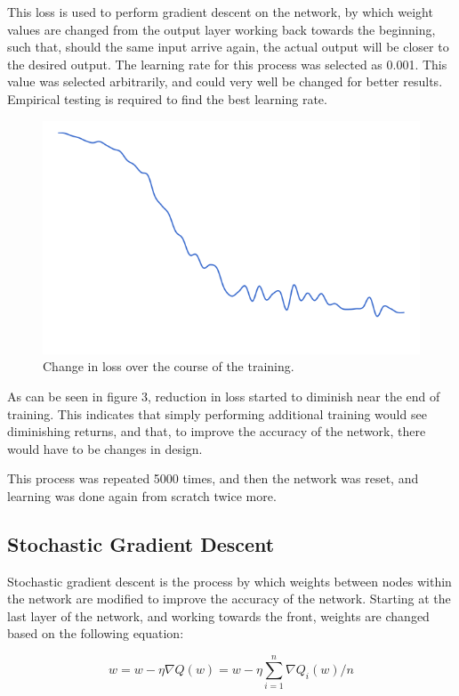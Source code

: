 \documentclass{article}
\begin{document}
This loss is used to perform gradient descent on the network, by which weight values are changed from the output layer working back towards the beginning, such that, should the same input arrive again, the actual output will be closer to the desired output. The learning rate for this process was selected as 0.001. This value was selected arbitrarily, and could very well be changed for better results. Empirical testing is required to find the best learning rate.

\begin{figure}
  \centering
  	\includegraphics[width=0.8\linewidth]{figures/chart}
  \caption{Change in loss over the course of the training.}
\end{figure}

As can be seen in figure 3, reduction in loss started to diminish near the end of training. This indicates that simply performing additional training would see diminishing returns, and that, to improve the accuracy of the network, there would have to be changes in design.

This process was repeated 5000 times, and then the network was reset, and learning was done again from scratch twice more.

\subsection{Stochastic Gradient Descent}

Stochastic gradient descent is the process by which weights between nodes within the network are modified to improve the accuracy of the network. Starting at the last layer of the network, and working towards the front, weights are changed based on the following equation:

\begin{equation*}
	w = w - \eta \nabla Q(w) = w - \eta \sum_{i=1}^{n} \nabla Q_i(w)/n
\end{equation*}
\end{document}

